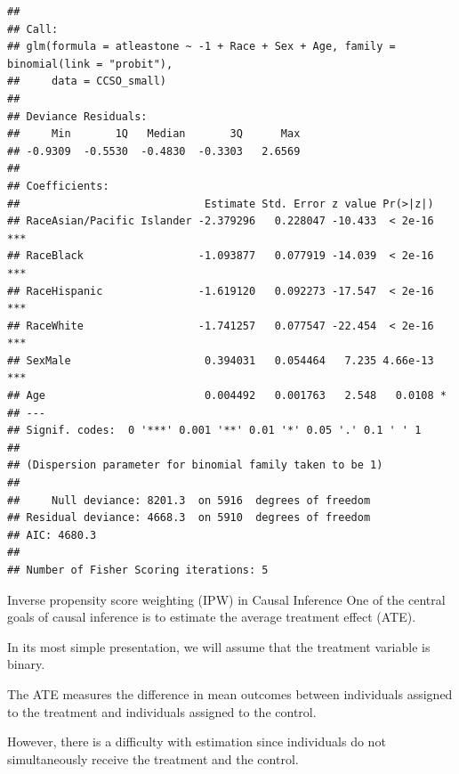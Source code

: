 \documentclass[
  ignorenonframetext,
]{beamer}
\begin{document}
\begin{frame}[fragile]{}
\begin{verbatim}
## 
## Call:
## glm(formula = atleastone ~ -1 + Race + Sex + Age, family = binomial(link = "probit"), 
##     data = CCSO_small)
## 
## Deviance Residuals: 
##     Min       1Q   Median       3Q      Max  
## -0.9309  -0.5530  -0.4830  -0.3303   2.6569  
## 
## Coefficients:
##                             Estimate Std. Error z value Pr(>|z|)    
## RaceAsian/Pacific Islander -2.379296   0.228047 -10.433  < 2e-16 ***
## RaceBlack                  -1.093877   0.077919 -14.039  < 2e-16 ***
## RaceHispanic               -1.619120   0.092273 -17.547  < 2e-16 ***
## RaceWhite                  -1.741257   0.077547 -22.454  < 2e-16 ***
## SexMale                     0.394031   0.054464   7.235 4.66e-13 ***
## Age                         0.004492   0.001763   2.548   0.0108 *  
## ---
## Signif. codes:  0 '***' 0.001 '**' 0.01 '*' 0.05 '.' 0.1 ' ' 1
## 
## (Dispersion parameter for binomial family taken to be 1)
## 
##     Null deviance: 8201.3  on 5916  degrees of freedom
## Residual deviance: 4668.3  on 5910  degrees of freedom
## AIC: 4680.3
## 
## Number of Fisher Scoring iterations: 5
\end{verbatim}
\end{frame}

\begin{frame}{Inverse propensity score weighting (IPW) in Causal
Inference}
\protect\hypertarget{inverse-propensity-score-weighting-ipw-in-causal-inference}{}
One of the central goals of causal inference is to estimate the average
treatment effect (ATE).

\vspace{12pt}

In its most simple presentation, we will assume that the treatment
variable is binary.

\vspace{12pt}

The ATE measures the difference in mean outcomes between individuals
assigned to the treatment and individuals assigned to the control.

\vspace{12pt}

However, there is a difficulty with estimation since individuals do not
simultaneously receive the treatment and the control.
\end{frame}
\end{document}
